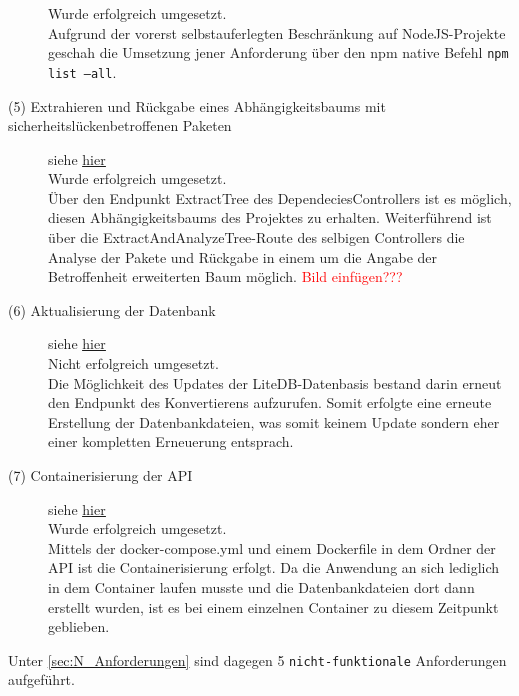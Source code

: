 \begin{description}
            Wurde erfolgreich umgesetzt.
            \\
            Aufgrund der vorerst selbstauferlegten Beschränkung auf NodeJS-Projekte geschah die Umsetzung jener Anforderung über den npm native Befehl \texttt{npm list --all}.
        \item[(5) Extrahieren und Rückgabe eines Abhängigkeitsbaums mit sicher\-heits\-lücken\-betroffenen Paketen] siehe \hyperref[f:five]{\underline{hier}} \hfill \\
            Wurde erfolgreich umgesetzt.
            \\
            Über den Endpunkt ExtractTree des DependeciesControllers ist es möglich, diesen Abhängig\-keitsbaums des Projektes zu erhalten.
            Weiterführend ist über die ExtractAndAnalyzeTree-Route des selbigen Controllers die Analyse der Pakete und Rückgabe in einem um die Angabe der Betroffenheit erweiterten Baum möglich.
            \textcolor{red}{Bild einfügen???}
        \item[(6) Aktualisierung der Datenbank] siehe \hyperref[f:six]{\underline{hier}} \hfill \\
            Nicht erfolgreich umgesetzt.
            \\
            Die Möglichkeit des Updates der LiteDB-Datenbasis bestand darin erneut den Endpunkt des Konvertierens aufzurufen.
            Somit erfolgte eine erneute Erstellung der Datenbankdateien, was somit keinem Update sondern eher einer kompletten Erneuerung entsprach.
        \item[(7) Containerisierung der \ac{API}] siehe \hyperref[f:seven]{\underline{hier}} \hfill \\
            Wurde erfolgreich umgesetzt.
            \\
            Mittels der docker-compose.yml und einem Dockerfile in dem Ordner der API ist die Containerisierung erfolgt.
            Da die Anwendung an sich lediglich in dem Container laufen musste und die Datenbankdateien dort dann erstellt wurden, ist es bei einem einzelnen Container zu diesem Zeitpunkt geblieben.
    \end{description}

    \noindent Unter \ref{sec:N_Anforderungen}  sind dagegen 5 \texttt{nicht-funktionale} Anforderungen aufgeführt.

